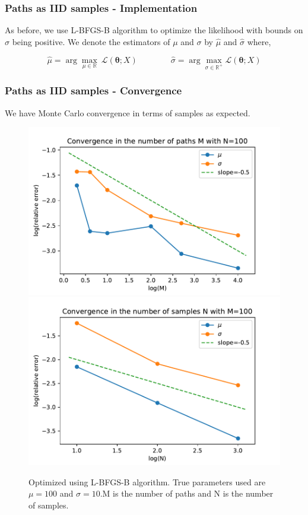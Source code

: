 \documentclass[aspectratio=169]{beamer}\usepackage[utf8]{inputenc}
\newcommand{\R}{\mathbb{R}}
\begin{document}
\begin{frame}\frametitle{ Paths as IID samples - Implementation }

As before, we use  L-BFGS-B algorithm to optimize the likelihood with bounds on $\sigma$ being positive. We denote the estimators of $\mu$ and $\sigma$ by  $\hat{\mu}$ and $\hat{\sigma}$ where,

\begin{equation}
 \hat{\mu} = \arg \underset{\mu \in \R}{\max} \ \mathcal{L}(\bm{\theta};X) \quad \quad  \quad \quad \hat{\sigma} = \arg \underset{\sigma \in \R^+}{\max} \mathcal{L}(\bm{\theta};X)
\end{equation}

\end{frame}

\begin{frame}\frametitle{ Paths as IID samples - Convergence }
We have Monte Carlo convergence in terms of samples as expected.
\begin{figure}
  \includegraphics[scale=0.5]{Figures/conv_M_unbounded.pdf}
   \includegraphics[scale=0.5]{Figures/conv_N_unbounded.pdf}
  \caption{ Optimized using L-BFGS-B algorithm. True parameters used are $\mu = 100$ and $\sigma = 10$.M is the number of paths and N is the number of samples.    }
\end{figure}

\end{frame}
\end{document}
